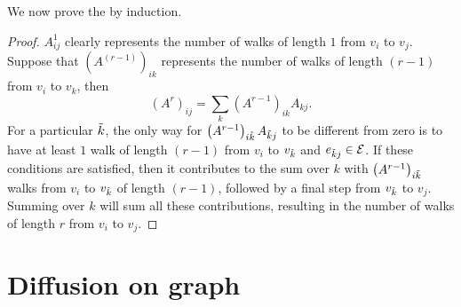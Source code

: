 \documentclass[12pt,a4paper]{report}
\theoremstyle{definition}
\begin{document}
We now prove the  by induction.
\begin{proof}
$A^1_{ij}$ clearly represents the number of walks of length $1$ from $v_i$ to $v_j$. Suppose that $\left( A^{(r-1)} \right)_{ik}$ represents the number of walks of length $(r-1)$ from $v_i$ to $v_k$, then
\begin{equation*}
    \left( A^{r} \right)_{ij} = \sum_k \left( A^{r-1} \right)_{ik} A_{kj}.
\end{equation*}
For a particular $\Tilde{k}$, the only way for $\left( A^{r-1} \right)_{i \Tilde{k}} A_{\Tilde{k} j}$ to be different from zero is to have at least $1$ walk of length $(r-1)$ from $v_i$ to $v_{\Tilde{k}}$ and $e_{\Tilde{k} j} \in \mathcal{E}$.
If these conditions are satisfied, then it contributes to the sum over $k$ with $\left( A^{r-1} \right)_{i \Tilde{k}}$ walks from $v_i$ to $v_{\Tilde{k}}$ of length $(r-1)$, followed by a final step from $v_{\Tilde{k}}$ to $v_j$.
Summing over $k$ will sum all these contributions, resulting in the number of walks of length $r$ from $v_i$ to $v_j$.
\end{proof}

\section{Diffusion on graph}
\label{sec:diffusion}
\end{document}
